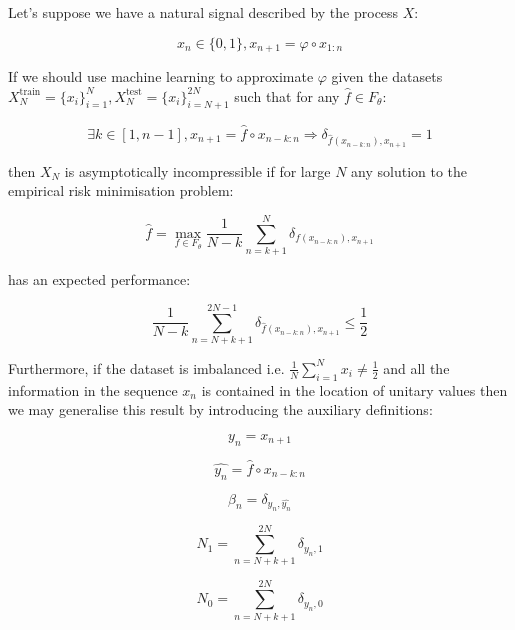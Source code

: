 \documentclass{article}
\begin{document}
Let's suppose we have a natural signal described by the process $X$: 

\begin{equation}
x_n \in \{0,1\}, x_{n+1} = \varphi \circ x_{1:n}	
\end{equation}

If we should use machine learning to approximate $\varphi$ given the datasets 
$X_N^{\text{train}}= \{x_i\}_{i=1}^N,X_N^{\text{test}}= \{x_i\}_{i=N+1}^{2N}$
such that for any $\hat{f} \in F_{\theta}$: 

\begin{equation}
\exists k \in [1,n-1], x_{n+1} = \hat{f} \circ x_{n-k:n} \Rightarrow \delta_{\hat{f}(x_{n-k:n}),x_{n+1}} = 1	
\end{equation}

then $X_N$ is asymptotically incompressible if for large $N$ any solution to the 
empirical risk minimisation problem: 

\begin{equation}
\hat{f} = \max_{f \in F_{\theta}} \frac{1}{N-k} \sum_{n=k+1}^N \delta_{f(x_{n-k:n}),x_{n+1}}
\end{equation}

has an expected performance: 

\begin{equation}
\frac{1}{N-k} \sum_{n=N+k+1}^{2N-1} \delta_{\hat{f}(x_{n-k:n}),x_{n+1}}
 \leq \frac{1}{2}
\end{equation}

Furthermore, if the dataset is imbalanced i.e. $\frac{1}{N} \sum_{i=1}^N x_i \neq \frac{1}{2}$ and all the information in the sequence $x_n$ is contained in the location of unitary values then we may generalise this result by introducing the auxiliary definitions: 

\begin{equation}
y_n = x_{n+1}	
\end{equation}

\begin{equation}
\hat{y_n} = \hat{f} \circ x_{n-k:n}
\end{equation}

\begin{equation}
\beta_n = \delta_{y_n,\hat{y_n}}	
\end{equation}

\begin{equation}
N_1 = \sum_{n=N+k+1}^{2N} \delta_{y_n,1}	
\end{equation}

\begin{equation}
N_0 = \sum_{n=N+k+1}^{2N} \delta_{y_n,0}	
\end{equation}
\end{document}
